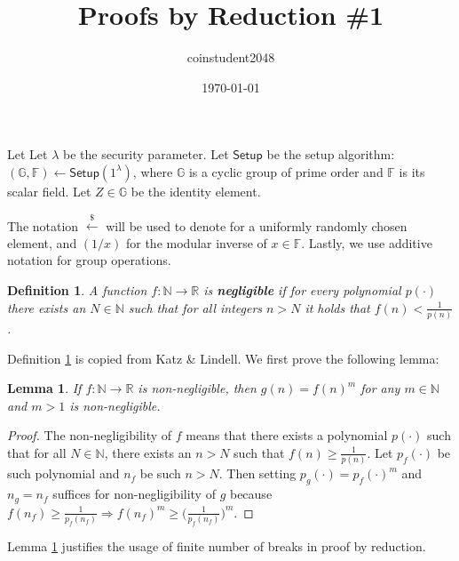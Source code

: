 \documentclass{article}
\title{Proofs by Reduction \#1}
\author{coinstudent2048}
\date{\today}
\newtheorem{definition}{Definition}[section]
\newtheorem{lemma}[theorem]{Lemma}
\begin{document}
\maketitle


\noindent Let Let $\lambda$ be the security parameter. Let $\textsf{Setup}$ be the setup algorithm: $(\mathbb{G}, \mathbb{F})\leftarrow\textsf{Setup}(1^{\lambda})$, where $\mathbb{G}$ is a cyclic group of prime order and $\mathbb{F}$ is its scalar field. Let $Z\in\mathbb{G}$ be the identity element.

The notation $\xleftarrow{\$}$ will be used to denote for a uniformly randomly chosen element, and $(1/x)$ for the modular inverse of $x\in\mathbb{F}$. Lastly, we use additive notation for group operations.

\begin{definition}\label{negl}
A function $f:\mathbb{N}\rightarrow\mathbb{R}$ is \textbf{\em negligible} if for every polynomial $p(\cdot)$ there exists an $N\in\mathbb{N}$ such that for all integers $n>N$ it holds that $f(n)<\frac{1}{p(n)}$.
\end{definition}

\noindent Definition \ref{negl} is copied from Katz \& Lindell. We first prove the following lemma:

\begin{lemma}\label{negl-exp}
If $f:\mathbb{N}\rightarrow\mathbb{R}$ is non-negligible, then $g(n)=f(n)^m$ for any $m\in\mathbb{N}$ and $m>1$ is non-negligible.
\end{lemma}
\begin{proof}
The non-negligibility of $f$ means that there exists a polynomial $p(\cdot)$ such that for all $N\in\mathbb{N}$, there exists an $n>N$ such that $f(n)\ge\frac{1}{p(n)}$. Let $p_f(\cdot)$ be such polynomial and $n_f$ be such $n>N$. Then setting $p_g(\cdot)=p_f(\cdot)^m$ and $n_g=n_f$ suffices for non-negligibility of $g$ because $f(n_f)\ge\frac{1}{p_f(n_f)}\Rightarrow f(n_f)^m\ge\big(\frac{1}{p_f(n_f)}\big)^m$.
\end{proof}

\noindent Lemma \ref{negl-exp} justifies the usage of finite number of breaks in proof by reduction.
\end{document}
